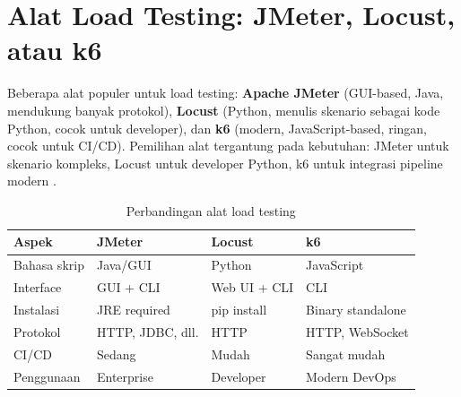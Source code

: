 ﻿\section{Alat Load Testing: JMeter, Locust, atau k6}

Beberapa alat populer untuk load testing: \textbf{Apache JMeter} (GUI-based, Java, mendukung banyak protokol), \textbf{Locust} (Python, menulis skenario sebagai kode Python, cocok untuk developer), dan \textbf{k6} (modern, JavaScript-based, ringan, cocok untuk CI/CD). Pemilihan alat tergantung pada kebutuhan: JMeter untuk skenario kompleks, Locust untuk developer Python, k6 untuk integrasi pipeline modern \cite{mdnToolsTesting}.

\begin{table}[H]
\centering
\begin{tabular}{|P{2.5cm}|P{3cm}|P{3.5cm}|P{3.5cm}|}
\hline
\textbf{Aspek} & \textbf{JMeter} & \textbf{Locust} & \textbf{k6} \\
\hline
Bahasa skrip & Java/GUI & Python & JavaScript \\
\hline
Interface & GUI + CLI & Web UI + CLI & CLI \\
\hline
Instalasi & JRE required & pip install & Binary standalone \\
\hline
Protokol & HTTP, JDBC, dll. & HTTP & HTTP, WebSocket \\
\hline
CI/CD & Sedang & Mudah & Sangat mudah \\
\hline
Penggunaan & Enterprise & Developer & Modern DevOps \\
\hline
\end{tabular}
\caption{Perbandingan alat load testing}
\end{table}

